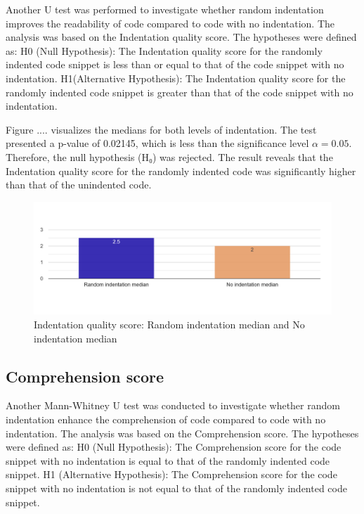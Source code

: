 Another  U test was performed to investigate whether random indentation improves the readability of code compared to code with no indentation. The analysis was based on the Indentation quality score. The hypotheses were defined as:  H0 (Null Hypothesis): The Indentation quality score for the randomly indented code snippet is less than or equal to that of the code snippet with no indentation.  H1(Alternative Hypothesis): The Indentation quality score for the randomly indented code snippet is greater than that of the code snippet with no indentation.

Figure .... visualizes the medians for both levels of indentation. 
The test presented a p-value of  0.02145, which is less than the significance level \(\alpha = 0.05\). Therefore, the null hypothesis (H₀) was rejected. The result reveals that the Indentation quality score for the randomly indented code was significantly higher than that of the unindented code.

\begin{figure} [H]
  \centering
  \includegraphics[scale=0.4]{figures/r-0-q5.png}
  \caption{Indentation quality score: Random indentation median and No indentation median}
  \label{fig:AnhangsChor}
\end{figure}


\subsection{Comprehension score}
Another Mann-Whitney U test was conducted to investigate whether random indentation enhance the comprehension  of code compared to code with no indentation. The analysis was based on the Comprehension score. The hypotheses were defined as: H0 (Null Hypothesis): The Comprehension score for the code snippet with no indentation is equal to that of the randomly indented code snippet. H1 (Alternative Hypothesis): The Comprehension score for the code snippet with no indentation is not equal to that of the randomly indented code snippet.

